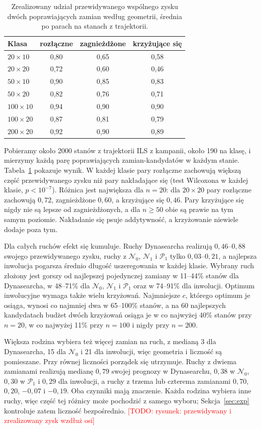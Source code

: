 \documentclass[10pt,twocolumn]{article}
\newcommand{\todo}[1]{\textcolor{red}{[TODO: #1]}}
\newcommand{\N}{\mathcal{N}}
\newcommand{\Pa}{\mathcal{P}}
\begin{document}
\begin{table}[t]
\centering
\caption{Zrealizowany udział przewidywanego wspólnego zysku dwóch
poprawiających zamian według geometrii, średnia po parach na stanach
z trajektorii.}
\label{tab:geometry}
\small
\begin{tabular}{@{}lccc@{}}
\toprule
Klasa & rozłączne & zagnieżdżone & krzyżujące się \\
\midrule
$20\times10$ & 0,80 & 0,65 & 0,58 \\
$20\times20$ & 0,72 & 0,60 & 0,46 \\
$50\times10$ & 0,90 & 0,85 & 0,83 \\
$50\times20$ & 0,82 & 0,76 & 0,71 \\
$100\times10$ & 0,94 & 0,90 & 0,90 \\
$100\times20$ & 0,87 & 0,81 & 0,79 \\
$200\times20$ & 0,92 & 0,90 & 0,89 \\
\bottomrule
\end{tabular}
\end{table}

Pobieramy około 2000 stanów z trajektorii ILS z kampanii, około 190 na
klasę, i mierzymy każdą parę poprawiających zamian-kandydatów w każdym
stanie. Tabela~\ref{tab:geometry} pokazuje wynik. W każdej klasie pary
rozłączne zachowują większą część przewidywanego zysku niż pary nakładające
się (test Wilcoxona w każdej klasie, $p<10^{-7}$). Różnica jest największa
dla $n=20$: dla $20\times20$ pary rozłączne zachowują $0{,}72$, zagnieżdżone
$0{,}60$, a krzyżujące się $0{,}46$. Pary krzyżujące się nigdy nie są lepsze
od zagnieżdżonych, a dla $n\geq50$ obie są prawie na tym samym poziomie.
Nakładanie się psuje addytywność, a krzyżowanie niewiele dodaje poza tym.

Dla całych ruchów efekt się kumuluje. Ruchy Dynasearcha realizują
$0{,}46$--$0{,}88$ swojego przewidywanego zysku, ruchy z $\N_0$, $\N_1$
i $\Pa_1$ tylko $0{,}03$--$0{,}21$, a najlepsza inwolucja pogarsza średnio
długość uszeregowania w każdej klasie. Wybrany ruch złożony jest gorszy od
najlepszej pojedynczej zamiany w 11--44\% stanów dla Dynasearcha,
w 48--71\% dla $\N_0$, $\N_1$ i $\Pa_1$ oraz w 74--91\% dla inwolucji.
Optimum inwolucyjne wymaga także wielu krzyżowań. Najmniejsze $c$,
którego optimum je osiąga, wynosi co najmniej dwa w 65--100\% stanów,
a na 60 najlepszych kandydatach budżet dwóch krzyżowań osiąga je w co
najwyżej 40\% stanów przy $n=20$, w co najwyżej 11\% przy $n=100$ i nigdy
przy $n=200$.

Większa rodzina wybiera też więcej zamian na ruch, z medianą 3 dla
Dynasearcha, 15 dla $\N_0$ i 21 dla inwolucji, więc geometria i liczność
są pomieszane. Przy równej liczności porządek się utrzymuje. Ruchy
z dwiema zamianami realizują medianę $0{,}79$ swojej prognozy
w Dynasearchu, $0{,}38$ w $\N_0$, $0{,}30$ w $\Pa_1$ i $0{,}29$ dla
inwolucji, a ruchy z trzema lub czterema zamianami $0{,}70$, $0{,}20$,
$-0{,}07$ i $-0{,}19$. Oba czynniki mają znaczenie. Każda rodzina wybiera
inne ruchy, więc część tej różnicy może pochodzić z samego wyboru;
Sekcja~\ref{sec:exp} kontroluje zatem liczność bezpośrednio.
\todo{rysunek: przewidywany i zrealizowany zysk wzdłuż osi}
\end{document}
